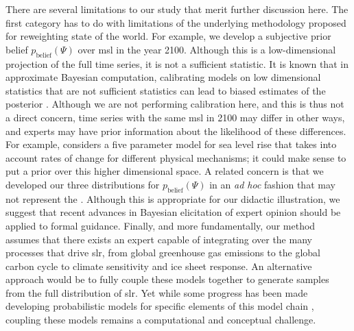 \documentclass[11pt]{article}
\makeatletter
\newcommand{\klaus}[1]{\todo[color=rosso, textcolor=grigio]{\textbf{ATTN Klaus:~}#1}}
\DeclareRobustCommand\onedot{\futurelet\@let@token\@onedot}
\def\@onedot{\ifx\@let@token.\else.\null\fi\xspace}
\def\eg{\emph{e.g}\onedot} \def\Eg{\emph{E.g}\onedot}
\DeclareRobustCommand\onedot{\futurelet\@let@token\@onedot}
\def\@onedot{\ifx\@let@token.\else.\null\fi\xspace}
\def\eg{\emph{e.g}\onedot} \def\Eg{\emph{E.g}\onedot}
\makeatother
\begin{document}
There are several limitations to our study that merit further discussion here.
The first category has to do with limitations of the underlying methodology proposed for reweighting state of the world.
For example, we develop a subjective prior belief $p_\mathrm{belief}(\Psi)$ over \gls{msl} in the year 2100.
Although this is a low-dimensional projection of the full time series, it is not a sufficient statistic.
It is known that in approximate Bayesian computation, calibrating models on low dimensional statistics that are not sufficient statistics can lead to biased estimates of the posterior \citep{csillery_abc:2010,marjoram_abc:2006}.
Although we are not performing calibration here, and this is thus not a direct concern, time series with the same \gls{msl} in 2100 may differ in other ways, and experts may have prior information about the likelihood of these differences.
For example, \citet{lempert_slr:2012} considers a five parameter model for sea level rise that takes into account rates of change for different physical mechanisms; it could make sense to put a prior over this higher dimensional space.
A related concern is that we developed our three distributions for $p_\mathrm{belief}(\Psi)$  in an \emph{ad hoc} fashion that may not represent the .
Although this is appropriate for our didactic illustration, we suggest that recent advances in Bayesian elicitation of expert opinion \citep[see][and references therein]{mikkola_elicitation:2021} should be applied to formal guidance.
Finally, and more fundamentally, our method assumes that there exists an expert capable of integrating over the many processes that drive \gls{slr}, from global greenhouse gas emissions to the global carbon cycle to climate sensitivity and ice sheet response.
An alternative approach would be to fully couple these models together to generate samples from the full distribution of \gls{slr}.
Yet while some progress has been made developing probabilistic models for specific elements of this model chain \citep[\eg,][]{srikrishnan_probabilistic:2022}, coupling these models remains a computational and conceptual challenge.\klaus{Is this too vague?}
\end{document}
